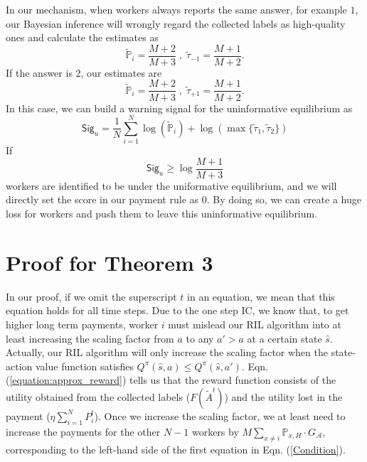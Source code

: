 \documentclass{article}
\begin{document}
In our mechanism, when workers always reports the same answer, for example $1$, our Bayesian inference will 
wrongly regard the collected labels as high-quality ones and calculate the estimates as
\begin{equation}
\tilde{\mathbb{P}}_i=\frac{M+2}{M+3}\;,\;\tilde{\tau}_{-1}=\frac{M+1}{M+2}.
\end{equation}
If the answer is $2$, our estimates are
\begin{equation}
\tilde{\mathbb{P}}_i=\frac{M+2}{M+3}\;,\;\tilde{\tau}_{+1}=\frac{M+1}{M+2}.
\end{equation}
In this case, we can build a warning signal for the uninformative equilibrium as
\begin{equation}
\mathsf{Sig}_u = \frac{1}{N}\sum_{i=1}^{N}\log(\tilde{\mathbb{P}}_i)+\log(\max\{\tilde{\tau}_1,\tilde{\tau}_2 \})
\end{equation}
If
\begin{equation}
\mathsf{Sig}_u\geq \log\frac{M+1}{M+3}
\end{equation}
workers are identified to be under the uniformative equilibrium, and we will directly set the score in our payment rule as $0$.
By doing so, we can create a huge loss for workers and push them to leave this uninformative equilibrium.

\section{Proof for Theorem 3}
In our proof, if we omit the superscript $t$ in an equation, we mean that this equation holds for all time steps.
Due to the one step IC, we know that, to get higher long term payments, worker $i$ must mislead our RIL algorithm into at least increasing the scaling factor from $a$ to any $a'>a$ at a certain state $\hat{s}$.
Actually, our RIL algorithm will only increase the scaling factor when the state-action value function satisfies $Q^{\pi}(\hat{s},a)\leq Q^{\pi}(\hat{s},a')$.
Eqn. (\ref{equation:approx_reward}) tells us that the reward function consists of the utility obtained from the collected labels ($F(\tilde{A}^t)$) and the utility lost in the payment ($\eta {\sum}_{i=1}^{N}P^t_i$).
Once we increase the scaling factor, we at least need to increase the payments for the other $N-1$ workers by $M\sum_{x\neq i} \mathbb{P}_{x,H}\cdot G_{\mathcal{A}}$, corresponding to the left-hand side of the first equation in Eqn. (\ref{Condition}).
\end{document}
